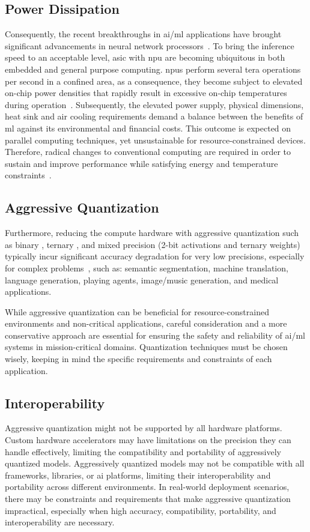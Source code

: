 \subsection{Power Dissipation}
Consequently, the recent breakthroughs in \gls{ai}/\gls{ml} applications have brought significant advancements in neural network processors~\cite{jouppi2017datacenter}. To bring the inference speed to an acceptable level, \gls{asic} with \gls{npu} are becoming ubiquitous in both embedded and general purpose computing. \glspl{npu} perform several tera operations per second in a confined area, as a consequence, they become subject to elevated on-chip power densities that rapidly result in excessive on-chip temperatures during operation~\cite{amrouch2020npu}. Subsequently, the elevated power supply, physical dimensions, heat sink and air cooling requirements demand a balance between the benefits of \gls{ml} against its environmental and financial costs. This outcome is expected on parallel computing techniques, yet unsustainable for resource-constrained devices.
Therefore, radical changes to conventional computing are required in order to sustain and improve performance while satisfying energy and temperature constraints~\cite{gillani2020exploiting}.

\subsection{Aggressive Quantization}
Furthermore, reducing the compute hardware with aggressive quantization such as binary \cite{courbariaux2015binaryconnect}, ternary \cite{lin2015neural}, and mixed precision (2-bit activations and ternary weights) \cite{colangelo2018exploration} typically incur significant accuracy degradation for very low precisions, especially for complex problems~\cite{faraone2019addnet}, such as: semantic segmentation, machine translation, language generation, playing agents, image/music generation, and medical applications.

While aggressive quantization can be beneficial for resource-constrained environments and non-critical applications, careful consideration and a more conservative approach are essential for ensuring the safety and reliability of \gls{ai}/\gls{ml} systems in mission-critical domains. Quantization techniques must be chosen wisely, keeping in mind the specific requirements and constraints of each application.

\subsection{Interoperability}
Aggressive quantization might not be supported by all hardware platforms. Custom hardware accelerators may have limitations on the precision they can handle effectively, limiting the compatibility and portability of aggressively quantized models. Aggressively quantized models may not be compatible with all frameworks, libraries, or \gls{ai} platforms, limiting their interoperability and portability across different environments. In real-world deployment scenarios, there may be constraints and requirements that make aggressive quantization impractical, especially when high accuracy, compatibility, portability, and interoperability are necessary.
